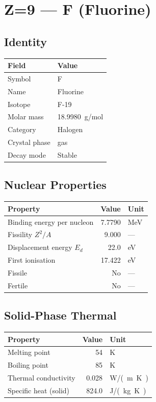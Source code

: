 \documentclass[11pt,a4paper]{article}
\begin{document}
\newpage

\section{Z=9 --- F (Fluorine)}
\label{sec:Z9}

\subsection{Identity}
\begin{tabular}{ll}
  \toprule
  Field & Value \\
  \midrule
  Symbol & F \\
  Name & Fluorine \\
  Isotope & F-19 \\
  Molar mass & \SI{18.9980}{g/mol} \\
  Category & Halogen \\
  Crystal phase & gas \\
  Decay mode & Stable \\
  \bottomrule
\end{tabular}

\subsection{Nuclear Properties}
\begin{tabular}{lrl}
  \toprule
  Property & Value & Unit \\
  \midrule
  Binding energy per nucleon & 7.7790 & \si{MeV} \\
  Fissility $Z^2/A$ & 9.000 & --- \\
  Displacement energy $E_d$ & 22.0 & \si{eV} \\
  First ionisation & 17.422 & \si{eV} \\
  Fissile & No & --- \\
  Fertile & No & --- \\
  \bottomrule
\end{tabular}

\subsection{Solid-Phase Thermal}
\begin{tabular}{lrl}
  \toprule
  Property & Value & Unit \\
  \midrule
  Melting point & 54 & \si{K} \\
  Boiling point & 85 & \si{K} \\
  Thermal conductivity & 0.028 & \si{W/(m.K)} \\
  Specific heat (solid) & 824.0 & \si{J/(kg.K)} \\
  \bottomrule
\end{tabular}
\end{document}
